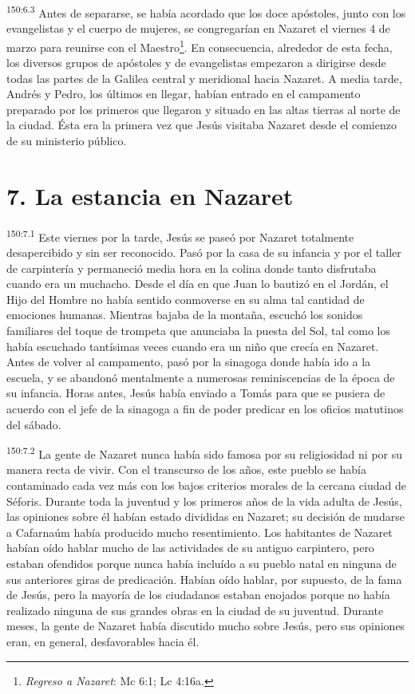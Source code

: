 \par 
\textsuperscript{150:6.3} Antes de separarse, se había acordado que los doce apóstoles, junto con los evangelistas y el cuerpo de mujeres, se congregarían en Nazaret el viernes 4 de marzo para reunirse con el Maestro\footnote{\textit{Regreso a Nazaret}: Mc 6:1; Lc 4:16a.}. En consecuencia, alrededor de esta fecha, los diversos grupos de apóstoles y de evangelistas empezaron a dirigirse desde todas las partes de la Galilea central y meridional hacia Nazaret. A media tarde, Andrés y Pedro, los últimos en llegar, habían entrado en el campamento preparado por los primeros que llegaron y situado en las altas tierras al norte de la ciudad. Ésta era la primera vez que Jesús visitaba Nazaret desde el comienzo de su ministerio público.

\section*{7. La estancia en Nazaret}
\par 
\textsuperscript{150:7.1} Este viernes por la tarde, Jesús se paseó por Nazaret totalmente desapercibido y sin ser reconocido. Pasó por la casa de su infancia y por el taller de carpintería y permaneció media hora en la colina donde tanto disfrutaba cuando era un muchacho. Desde el día en que Juan lo bautizó en el Jordán, el Hijo del Hombre no había sentido conmoverse en su alma tal cantidad de emociones humanas. Mientras bajaba de la montaña, escuchó los sonidos familiares del toque de trompeta que anunciaba la puesta del Sol, tal como los había escuchado tantísimas veces cuando era un niño que crecía en Nazaret. Antes de volver al campamento, pasó por la sinagoga donde había ido a la escuela, y se abandonó mentalmente a numerosas reminiscencias de la época de su infancia. Horas antes, Jesús había enviado a Tomás para que se pusiera de acuerdo con el jefe de la sinagoga a fin de poder predicar en los oficios matutinos del sábado.

\par 
\textsuperscript{150:7.2} La gente de Nazaret nunca había sido famosa por su religiosidad ni por su manera recta de vivir. Con el transcurso de los años, este pueblo se había contaminado cada vez más con los bajos criterios morales de la cercana ciudad de Séforis. Durante toda la juventud y los primeros años de la vida adulta de Jesús, las opiniones sobre él habían estado divididas en Nazaret; su decisión de mudarse a Cafarnaúm había producido mucho resentimiento. Los habitantes de Nazaret habían oído hablar mucho de las actividades de su antiguo carpintero, pero estaban ofendidos porque nunca había incluído a su pueblo natal en ninguna de sus anteriores giras de predicación. Habían oído hablar, por supuesto, de la fama de Jesús, pero la mayoría de los ciudadanos estaban enojados porque no había realizado ninguna de sus grandes obras en la ciudad de su juventud. Durante meses, la gente de Nazaret había discutido mucho sobre Jesús, pero sus opiniones eran, en general, desfavorables hacia él.

